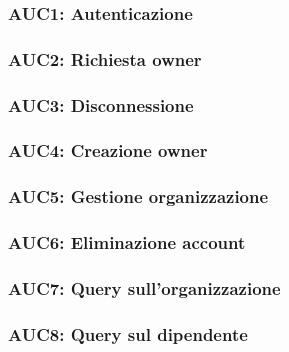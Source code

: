 \documentclass[../analisi-dei-requisiti.tex]{subfiles}
\begin{document}
\subsubsection{AUC1: Autenticazione}%
\label{subs:AUC1}



\subsubsection{AUC2: Richiesta owner}%
\label{subs:AUC2}



\subsubsection{AUC3: Disconnessione}%
\label{subs:AUC3}



\subsubsection{AUC4: Creazione owner}%
\label{subs:AUC4}



\subsubsection{AUC5: Gestione organizzazione}%
\label{subs:AUC5}



\subsubsection{AUC6: Eliminazione account}%
\label{subs:AUC6}



\subsubsection{AUC7: Query sull'organizzazione}%
\label{subs:AUC7}



\subsubsection{AUC8: Query sul dipendente}%
\label{subs:AUC8}
\end{document}
